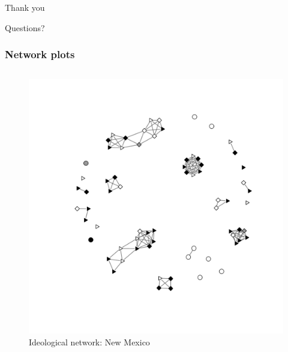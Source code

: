 \documentclass{beamer}
\begin{document}
\begin{frame}
\Huge{\centerline{Thank you}}
\vspace{5mm}
\Huge{\centerline{Questions?}}
\end{frame}


\begin{frame}
\frametitle{Network plots}
\begin{columns}[c]

\begin{figure}
\centering
\includegraphics[scale=0.35]{Coppock_ideological_net.pdf}
\caption {Ideological network: New Mexico}
\end{figure}


\end{columns}
\end{frame}
\end{document}
